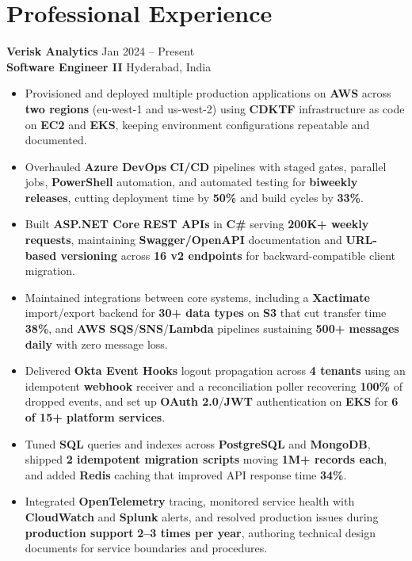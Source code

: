 \documentclass[a4paper,10pt]{article}
\begin{document}
\section*{Professional Experience}

\textbf{Verisk Analytics} \hfill Jan 2024 -- Present \\
\textbf{Software Engineer II} \hfill Hyderabad, India

\begin{itemize}[leftmargin=*]
    \item Provisioned and deployed multiple production applications on \textbf{AWS} across \textbf{two regions} (eu-west-1 and us-west-2) using \textbf{CDKTF} infrastructure as code on \textbf{EC2} and \textbf{EKS}, keeping environment configurations repeatable and documented.
    \item Overhauled \textbf{Azure DevOps} \textbf{CI/CD} pipelines with staged gates, parallel jobs, \textbf{PowerShell} automation, and automated testing for \textbf{biweekly releases}, cutting deployment time by \textbf{50\%} and build cycles by \textbf{33\%}.
    \item Built \textbf{ASP.NET Core} \textbf{REST APIs} in \textbf{C\#} serving \textbf{200K+ weekly requests}, maintaining \textbf{Swagger/OpenAPI} documentation and \textbf{URL-based versioning} across \textbf{16 v2 endpoints} for backward-compatible client migration.
    \item Maintained integrations between core systems, including a \textbf{Xactimate} import/export backend for \textbf{30+ data types} on \textbf{S3} that cut transfer time \textbf{38\%}, and \textbf{AWS SQS}/\textbf{SNS}/\textbf{Lambda} pipelines sustaining \textbf{500+ messages daily} with zero message loss.
    \item Delivered \textbf{Okta Event Hooks} logout propagation across \textbf{4 tenants} using an idempotent \textbf{webhook} receiver and a reconciliation poller recovering \textbf{100\%} of dropped events, and set up \textbf{OAuth 2.0}/\textbf{JWT} authentication on \textbf{EKS} for \textbf{6 of 15+ platform services}.
    \item Tuned \textbf{SQL} queries and indexes across \textbf{PostgreSQL} and \textbf{MongoDB}, shipped \textbf{2 idempotent migration scripts} moving \textbf{1M+ records each}, and added \textbf{Redis} caching that improved API response time \textbf{34\%}.
    \item Integrated \textbf{OpenTelemetry} tracing, monitored service health with \textbf{CloudWatch} and \textbf{Splunk} alerts, and resolved production issues during \textbf{production support} \textbf{2--3 times per year}, authoring technical design documents for service boundaries and procedures.

\end{itemize}
\end{document}
